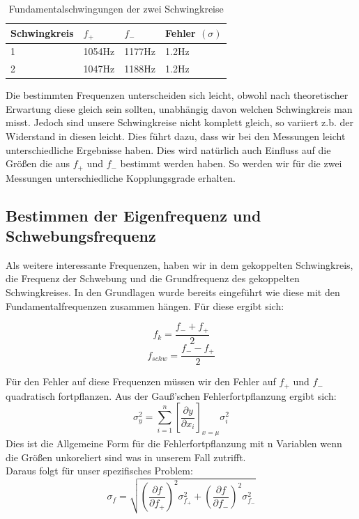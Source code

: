 \documentclass[twoside]{protokoll}
\begin{document}
\begin{table}[H]
    \centering
    \begin{tabularx}{1\textwidth}{X X X X} %
        \toprule
        \textbf{Schwingkreis} & \textbf{$f_+$ } & \textbf{$f_-$ } & \textbf{Fehler $(\sigma)$}\\
        \midrule
        1 & 1054Hz & 1177Hz & 1.2Hz\\
        2 & 1047Hz & 1188Hz & 1.2Hz\\
        \bottomrule
    \end{tabularx}
    \caption{Fundamentalschwingungen der zwei Schwingkreise}
    \label{•}
\end{table}

Die bestimmten Frequenzen unterscheiden sich leicht, obwohl nach theoretischer Erwartung diese gleich sein sollten, unabhängig davon welchen Schwingkreis man misst.
Jedoch sind unsere Schwingkreise nicht komplett gleich, so variiert z.b. der Widerstand in diesen leicht. Dies führt dazu, dass wir bei den Messungen leicht unterschiedliche Ergebnisse haben. 
Dies wird natürlich auch Einfluss auf die Größen die aus $f_+$ und $f_-$ bestimmt werden haben. So werden wir für die zwei Messungen unterschiedliche Kopplungsgrade erhalten.

\subsection{Bestimmen der Eigenfrequenz und Schwebungsfrequenz}


Als weitere interessante Frequenzen, haben wir in dem gekoppelten Schwingkreis, die Frequenz der Schwebung und die Grundfrequenz des gekoppelten Schwingkreises. 
In den Grundlagen wurde bereits eingeführt wie diese mit den Fundamentalfrequenzen zusammen hängen.
Für diese ergibt sich:

\begin{equation}
    f_k = \frac{f_- + f_+}{2}
    \label{Funktion f Schwebung}
\end{equation}
\begin{equation}
    f_{schw} = \frac{f_- - f_+}{2}
    \label{Funktion f grund}
\end{equation}

Für den Fehler auf diese Frequenzen müssen wir den Fehler auf $f_+$ und $f_-$ quadratisch fortpflanzen. Aus der Gauß'schen Fehlerfortpflanzung ergibt sich:
\begin{equation}
	\sigma_y^2 = \sum_{i=1}^n\left[\frac{\partial y}{\partial x_i}\right]_{x=\mu}\sigma_{i}^2
\label{Fehlerfortpflanzung}
\end{equation}
Dies ist die Allgemeine Form für die Fehlerfortpflanzung mit n Variablen wenn die Größen unkoreliert sind was in unserem Fall zutrifft.\\
Daraus folgt für unser spezifisches Problem:
\begin{equation}
\sigma_f =\sqrt{ \left(\frac{\partial f}{\partial f_+}\right)^2\sigma_{f_+}^2 + \left(\frac{\partial f}{\partial f_-}\right)^2\sigma_{f_-}^2}
\end{equation}
\end{document}
